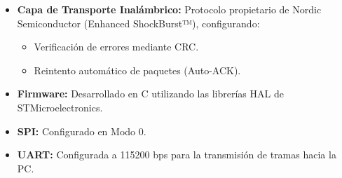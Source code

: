 \documentclass[12pt,a4paper]{article}
\begin{document}
\begin{itemize}
	\item \textbf{Capa de Transporte Inalámbrico: }Protocolo propietario de Nordic Semiconductor (Enhanced ShockBurst™), configurando:
	\begin{itemize}
		\item Verificación de errores mediante CRC.
		\item Reintento automático de paquetes (Auto-ACK).
	\end{itemize}
	\item \textbf{Firmware:} Desarrollado en C utilizando las librerías HAL de STMicroelectronics.
	\item \textbf{SPI:} Configurado en Modo 0.
	\item \textbf{UART:} Configurada a 115200 bps para la transmisión de tramas hacia la PC.
\end{itemize}
\end{document}
